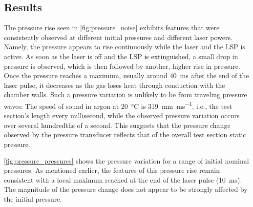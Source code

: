        \subsection{Results}
            The pressure rise seen in \autoref{fig:pressure_noise} exhibits features that were consistently observed at different initial pressures and different laser powers. Namely, the pressure appears to rise continuously while the laser and the LSP is active. As soon as the laser is off and the LSP is extinguished, a small drop in pressure is observed, which is then followed by another, higher rise in pressure. Once the pressure reaches a maximum, usually around \qty{40}{ms} after the end of the laser pulse, it decreases  as the gas loses heat through conduction with the chamber walls. Such a pressure variation is unlikely to be from traveling pressure waves: The speed of sound in argon at \qty{20}{\degreeCelsius} is \qty{319}{mm.ms^{-1}}, i.e., the test section's length every millisecond, while the observed pressure variation occurs over several hundredths of a second. This suggests that the pressure change observed by the pressure transducer reflects that of the overall test section static pressure.

            \autoref{fig:pressure_pressures} shows the pressure variation for a range of initial nominal pressures. As mentioned earlier, the features of this pressure rise remain consistent with a local maximum reached at the end of the laser pulse (\qty{10}{ms}). The magnitude of the pressure change does not appear to be strongly affected by the initial pressure.

